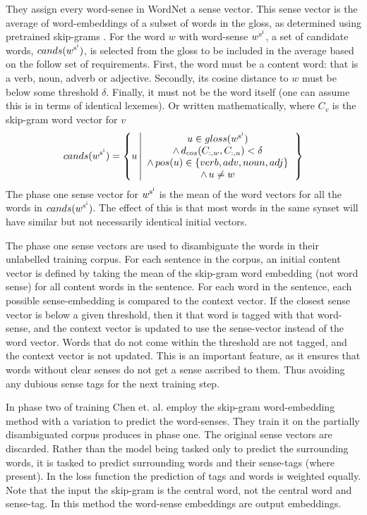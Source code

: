 \documentclass[12pt,parskip]{komatufte}
\begin{document}
They assign every word-sense in WordNet a sense vector.
This sense vector is the average of word-embeddings of a subset of words in the gloss,
as determined using pretrained skip-grams \parencite{mikolov2013efficient}.
For the word $w$ with word-sense $\d w_{\n s_i}$,
a set of candidate words, $cands(\d w_{\n s_i})$, is selected from the gloss to be included in the average
based on the follow set of requirements.
First, the word must be a content word: that is a verb, noun, adverb or adjective.
Secondly, its cosine distance to $w$ must be below some threshold $\delta$.
Finally, it must not be the word itself (one can assume this is in terms of identical lexemes).
Or written mathematically, where $C_v$ is the skip-gram word vector for $v$
\begin{equation}
cands(\d w_{\n s_{i}})=\left\{ u\left|\begin{array}{c}
u \in gloss(\d w_{\n s_{i}})\\
\wedge\, d_{cos}(\i C_w, \i C_u)<\delta\\
\wedge\, pos(u)\in\left\{ verb,adv,noun,adj\right\} \\
\wedge\, u\ne w
\end{array}\right.\right\} 
\end{equation}
The phase one sense vector for $\d w_{\n s_i}$ is the mean of the word vectors for all the words in $cands(\d w_{\n s_{i}})$.
The effect of this is that most words in the same synset will have similar but not necessarily identical initial vectors.

The phase one sense vectors are used to disambiguate the words in their unlabelled training corpus.
For each sentence in the corpus, an initial content vector is defined by taking the mean of the skip-gram word embedding (not word sense) for all content words in the sentence.
For each word in the sentence, each possible sense-embedding is compared to the context vector.
If the closest sense vector is below a given threshold,
then it that word is tagged with that word-sense, and the context vector is updated to use the sense-vector instead of the word vector.
Words that do not come within the threshold are not tagged, and the context vector is not updated.
This is an important feature, as it ensures that words without clear senses do not get a sense ascribed to them.
Thus avoiding any dubious sense tags for the next training step.

In phase two of training
Chen et. al. employ the skip-gram word-embedding method with a variation to predict the word-senses.
They train it on the partially disambiguated corpus produces in phase one.
The original sense vectors are discarded.
Rather than the model being tasked only to predict the surrounding words, it is tasked to predict surrounding words and their sense-tags (where present).
In the loss function the prediction of tags and words is weighted equally.
Note that the input the skip-gram is the central word, not the central word and sense-tag.
In this method the word-sense embeddings are output embeddings.
\end{document}
